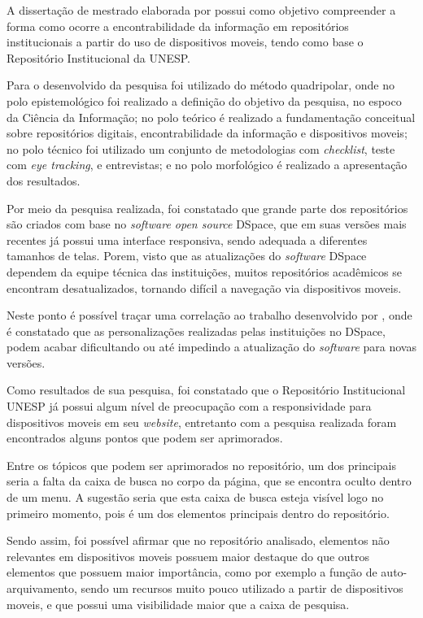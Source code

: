 A dissertação de mestrado elaborada por \cite{FernandesMacedes:2019}
possui como objetivo compreender a forma como ocorre a encontrabilidade
da informação em repositórios institucionais a partir do uso de dispositivos
moveis, tendo como base o Repositório Institucional da UNESP.

Para o desenvolvido da pesquisa foi utilizado do método quadripolar, onde
no polo epistemológico foi realizado a definição do objetivo da pesquisa,
no espoco da Ciência da Informação; no polo teórico é realizado a
fundamentação conceitual sobre repositórios digitais, encontrabilidade
da informação e dispositivos moveis; no polo técnico foi utilizado um
conjunto de metodologias com \emph{checklist}, teste com \emph{eye tracking},
e entrevistas; e no polo morfológico é realizado a apresentação dos resultados.

Por meio da pesquisa realizada, foi constatado que grande parte dos
repositórios são criados com base no \emph{software open source} DSpace,
que em suas versões mais recentes já possui uma interface responsiva,
sendo adequada a diferentes tamanhos de telas. Porem, visto que as
atualizações do \emph{software} DSpace dependem da equipe técnica das instituições,
muitos repositórios acadêmicos se encontram desatualizados, tornando
difícil a navegação via dispositivos moveis.

Neste ponto é possível traçar uma correlação ao trabalho desenvolvido por
\cite{GarciaRodrigoMoreira2019DdnB}, onde é constatado que as
personalizações realizadas pelas instituições no DSpace,
podem acabar dificultando ou até impedindo a atualização do
\emph{software} para novas versões.

Como resultados de sua pesquisa, foi constatado que o Repositório
Institucional UNESP já possui algum nível de preocupação com a
responsividade para dispositivos moveis em seu \emph{website},
entretanto com a pesquisa realizada foram encontrados alguns
pontos que podem ser aprimorados.

Entre os tópicos que podem ser aprimorados no repositório,
um dos principais seria a falta da caixa de busca no corpo
da página, que se encontra oculto dentro de um menu. A sugestão
seria que esta caixa de busca esteja visível logo no primeiro
momento, pois é um dos elementos principais dentro do repositório.

Sendo assim, foi possível afirmar que no repositório analisado,
elementos não relevantes em dispositivos moveis possuem maior destaque
do que outros elementos que possuem maior importância,
como por exemplo a função de auto-arquivamento,
sendo um recursos muito pouco utilizado a partir de dispositivos moveis,
e que possui uma visibilidade maior que a caixa de pesquisa.

